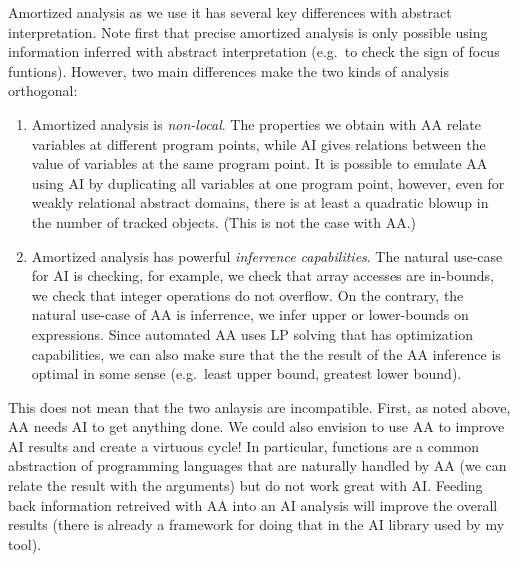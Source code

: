 \documentclass[nocopyrightspace,preprint]{sigplanconf-pldi15}
\begin{document}
Amortized analysis as we use it has several key differences
with abstract interpretation.  Note first that precise amortized
analysis is only possible using information inferred with abstract
interpretation (e.g.\ to check the sign of focus funtions).
However, two main differences make the two kinds of analysis
orthogonal:

\begin{enumerate}

\item Amortized analysis is \emph{non-local}. The properties
we obtain with AA relate variables at different program points,
while AI gives relations between the value of variables at the
same program point.  It is possible to emulate AA using AI by
duplicating all variables at one program point, however, even
for weakly relational abstract domains, there is at least a
quadratic blowup in the number of tracked objects.  (This is
not the case with AA.)

\item Amortized analysis has powerful \emph{inferrence
capabilities}.  The natural use-case for AI is checking, for
example, we check that array accesses are in-bounds, we check
that integer operations do not overflow.  On the contrary,
the natural use-case of AA is inferrence, we infer upper or
lower-bounds on expressions.  Since automated AA uses LP
solving that has optimization capabilities, we can also make
sure that the the result of the AA inference is optimal in
some sense (e.g.\ least upper bound, greatest lower bound).

\end{enumerate}

This does not mean that the two anlaysis are incompatible.
First, as noted above, AA needs AI to get anything done.  We could
also envision to use AA to improve AI results and create a
virtuous cycle!  In particular, functions are a common abstraction
of programming languages that are naturally handled by AA (we
can relate the result with the arguments) but do not work great
with AI.  Feeding back information retreived with AA into an AI
analysis will improve the overall results (there is already a
framework for doing that in the AI library used by my tool).
\end{document}
